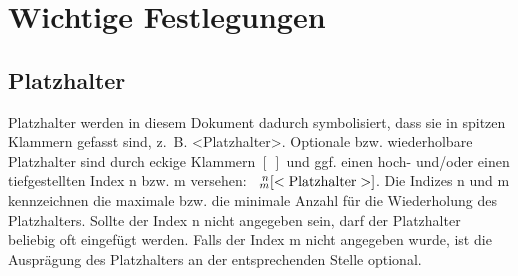 \chapter{Wichtige Festlegungen}\label{chap:Wichtige Festlegungen}
\section{Platzhalter}\label{sec:Platzhalter}
Platzhalter werden in diesem Dokument dadurch symbolisiert, dass sie in spitzen Klammern gefasst sind, z.~B. <Platzhalter>. Optionale bzw. wiederholbare Platzhalter sind durch eckige Klammern $[~]$ und ggf. einen hoch- und/oder einen tiefgestellten Index n bzw. m versehen: $\nmsbracket{n}{m}{22}\mathrm{<Platzhalter>}]$. Die Indizes n und m kennzeichnen die maximale bzw. die minimale Anzahl für die Wiederholung des Platzhalters. Sollte der Index n nicht angegeben sein, darf der Platzhalter beliebig oft eingefügt werden. Falls der Index m nicht angegeben wurde, ist die Ausprägung des Platzhalters an der entsprechenden Stelle optional.
